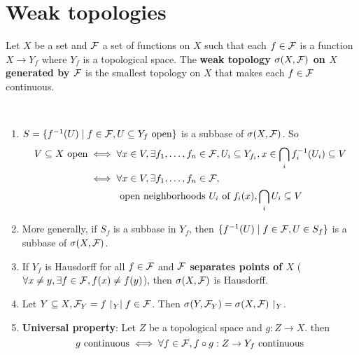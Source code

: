 \documentclass{article}
\begin{document}
\clearpage

\section{Weak topologies}
Let $X$ be a set and $\mathcal F$ a set of functions on $X$ such that each $f \in \mathcal F$ is a function $X \to Y_f$ where $Y_f$ is a topological space. The {\bf weak topology $\sigma(X, \mathcal F)$ on $X$ generated by $\mathcal F$} is the smallest topology on $X$ that makes each $f \in \mathcal F$ continuous.

\begin{rmks}~
  \begin{enumerate}
    \item $S = \{f^{-1}(U) \mid f \in \mathcal F, U \subseteq Y_f \text{ open}\}$ is a subbase of $\sigma(X, \mathcal F)$. So
    \begin{align*}
      V \subseteq X \text{ open}
      \iff {} & \forall x \in V, \exists f_1, \dots, f_n \in \mathcal F, U_i \subseteq Y_{f_i}, x \in \bigcap_i f_i^{-1}(U_i) \subseteq V \\
      \iff {} & \forall x \in V, \exists f_1, \dots, f_n \in \mathcal F, \\
      & \text{ open neighborhoods } U_i \text{ of } f_i(x), \bigcap_i U_i \subseteq V
    \end{align*}
    \item More generally, if $S_f$ is a subbase in $Y_f$, then $\{f^{-1}(U) \mid f \in \mathcal F, U \in S_f\}$ is a subbase of $\sigma(X, \mathcal F)$.
    \item If $Y_f$ is Hausdorff for all $f \in \mathcal F$ and {\bf $\mathcal F$ separates points of $X$} ($\forall x \ne y, \exists f \in \mathcal F, f(x) \ne f(y)$), then $\sigma(X, \mathcal F)$ is Hausdorff.
    \item Let $Y \subseteq X, \mathcal F_Y = {f\restriction_Y \mid f \in \mathcal F}$. Then $\sigma(Y, \mathcal F_Y) = \sigma(X, \mathcal F)\restriction_Y$.
    \item {\bf Universal property}: Let $Z$ be a topological space and $g : Z \to X$. then
    $$g \text{ continuous} \iff \forall f \in \mathcal F, f \circ g : Z \to Y_f \text{ continuous}$$
  \end{enumerate}
\end{rmks}
\end{document}
